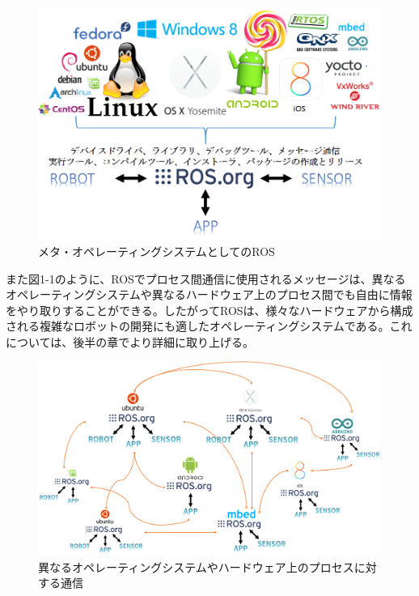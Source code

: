 \begin{figure}[h]
  \centering
  \includegraphics[width=\columnwidth]{pictures/chapter1/pic_01_01.png}
  \caption{メタ・オペレーティングシステムとしてのROS}
\end{figure}


また図1-1のように、ROSでプロセス間通信に使用されるメッセージは、異なるオペレーティングシステムや異なるハードウェア上のプロセス間でも自由に情報をやり取りすることができる。したがってROSは、様々なハードウェアから構成される複雑なロボットの開発にも適したオペレーティングシステムである。これについては、後半の章でより詳細に取り上げる。

\begin{figure}[h]
  \centering
  \includegraphics[width=\columnwidth]{pictures/chapter1/pic_01_02.png}
  \caption{異なるオペレーティングシステムやハードウェア上のプロセスに対する通信}
\end{figure}

